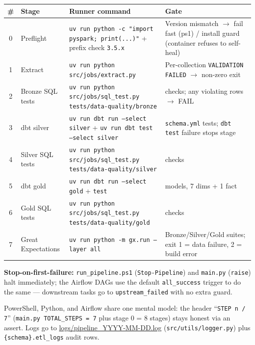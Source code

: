 \documentclass[11pt,a4paper]{article}
\begin{document}
\begin{center}
\begin{longtable}{c >{\raggedright\arraybackslash}p{2.6cm} >{\raggedright\arraybackslash}p{5.4cm} >{\raggedright\arraybackslash}p{4.8cm}}
\toprule
\# & Stage & Runner command & Gate \\
\midrule
\endhead
0 & Preflight & \texttt{uv run python -c "import pyspark; print(...)"} + prefix check \texttt{3.5.x} & Version mismatch $\rightarrow$ fail fast (ps1) / install guard (container refuses to self-heal) \\
1 & Extract & \texttt{uv run python src/jobs/extract.py} & Per-collection \texttt{VALIDATION FAILED} $\rightarrow$ non-zero exit \\
2 & Bronze SQL tests & \texttt{uv run python src/jobs/sql\_test.py tests/data-quality/bronze} & 3 checks; any violating rows $\rightarrow$ FAIL \\
3 & dbt silver & \texttt{uv run dbt run --select silver} + \texttt{uv run dbt test --select silver} & \texttt{schema.yml} tests; \texttt{dbt test} failure stops stage \\
4 & Silver SQL tests & \texttt{uv run python src/jobs/sql\_test.py tests/data-quality/silver} & 9 checks \\
5 & dbt gold & \texttt{uv run dbt run --select gold} + \texttt{test} & 8 models, 7 dims + 1 fact \\
6 & Gold SQL tests & \texttt{uv run python src/jobs/sql\_test.py tests/data-quality/gold} & 7 checks \\
7 & Great Expectations & \texttt{uv run python -m gx.run --layer all} & Bronze/Silver/Gold suites; exit 1 = data failure, 2 = build error \\
\bottomrule
\end{longtable}
\end{center}

\textbf{Stop-on-first-failure:} \texttt{run\_pipeline.ps1} (\texttt{Stop-Pipeline}) and \texttt{main.py} (\texttt{raise}) halt immediately; the Airflow DAGs use the default \texttt{all\_success} trigger to do the same — downstream tasks go to \texttt{upstream\_failed} with no extra guard.

PowerShell, Python, and Airflow share one mental model: the header ``\texttt{STEP n / 7}'' (\texttt{main.py TOTAL\_STEPS = 7} plus stage 0 = 8 stages) stays honest via an assert. Logs go to \url{logs/pipeline_YYYY-MM-DD.log} (\texttt{src/utils/logger.py}) plus \texttt{\{schema\}.etl\_logs} audit rows.

\end{document}
